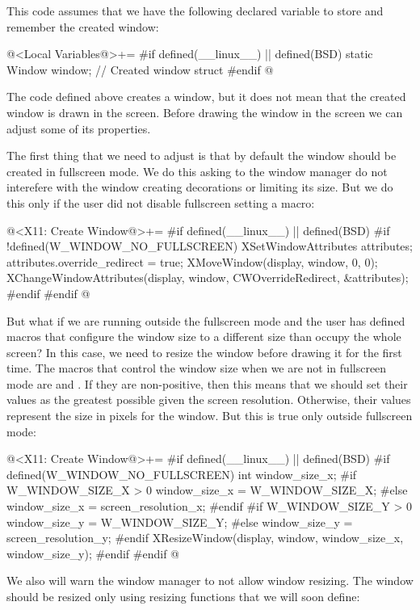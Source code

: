 This code assumes that we have the following declared variable to
store and remember the created window:

\iniciocodigo
@<Local Variables@>+=
#if defined(__linux__) || defined(BSD)
static Window window;    // Created window struct
#endif
@
\fimcodigo

The code defined above creates a window, but it does not mean that the
created window is drawn in the screen. Before drawing the window in
the screen we can adjust some of its properties.

The first thing that we need to adjust is that by default the window
should be created in fullscreen mode. We do this asking to the window
manager do not interefere with the window creating decorations or
limiting its size. But we do this only if the user did not disable
fullscreen setting a macro:

\iniciocodigo
@<X11: Create Window@>+=
#if defined(__linux__) || defined(BSD)
#if !defined(W_WINDOW_NO_FULLSCREEN)
{
  XSetWindowAttributes attributes;
  attributes.override_redirect = true;
  XMoveWindow(display, window, 0, 0);
  XChangeWindowAttributes(display, window, CWOverrideRedirect,
                          &attributes);
}
#endif
#endif
@
\fimcodigo

But what if we are running outside the fullscreen mode and the user
has defined macros that configure the window size to a different size
than occupy the whole screen? In this case, we need to resize the
window before drawing it for the first time. The macros that control
the window size when we are not in fullscreen mode
are 
and . If they are non-positive,
then this means that we should set their values as the greatest
possible given the screen resolution. Otherwise, their values
represent the size in pixels for the window. But this is true only
outside fullscreen mode:

\iniciocodigo
@<X11: Create Window@>+=
#if defined(__linux__) || defined(BSD)
#if defined(W_WINDOW_NO_FULLSCREEN)
{
  int window_size_x;
#if W_WINDOW_SIZE_X > 0
  window_size_x = W_WINDOW_SIZE_X;
#else
  window_size_x = screen_resolution_x;
#endif
#if W_WINDOW_SIZE_Y > 0
  window_size_y = W_WINDOW_SIZE_Y;
#else
  window_size_y = screen_resolution_y;
#endif
  XResizeWindow(display, window, window_size_x, window_size_y);
}
#endif
#endif
@
\fimcodigo

We also will warn the window manager to not allow window resizing. The
window should be resized only using resizing functions that we will
soon define:


